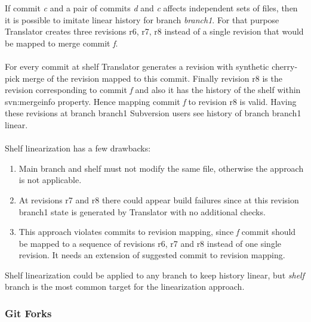If commit \emph{c} and a pair of commits \emph{d} and \emph{c} affects independent sets of files, 
then it is possible to imitate linear history for branch \emph{branch1}. 
For that purpose Translator creates three revisions r6, r7, r8 instead of a single revision that would be mapped to merge commit \emph{f}.
\\\\
For every commit at shelf Translator generates a revision with synthetic cherry-pick merge of the revision mapped to this commit. Finally revision r8 is the revision corresponding to commit \emph{f} and also it has the history of the shelf within svn:mergeinfo property. Hence mapping commit \emph{f} to revision r8 is valid. Having these revisions at branch branch1 Subversion users see history of branch branch1 linear.
\\\\
Shelf linearization has a few drawbacks:
\begin{enumerate}
\compactlist
	\item Main branch and shelf must not modify the same file, otherwise the approach is not applicable.
	\item At revisions r7 and r8 there could appear build failures since at this revision branch1 state is generated by Translator with no additional checks.
	\item This approach violates commits to revision mapping, since \emph{f} commit should be mapped to a sequence of revisions r6, r7 and r8 instead of one single revision. It needs an extension of suggested commit to revision mapping. %
\end{enumerate}

Shelf linearization could be applied to any branch to keep history linear, but \emph{shelf} branch is the most common target
for the linearization approach.

\subsubsection{Git Forks}

